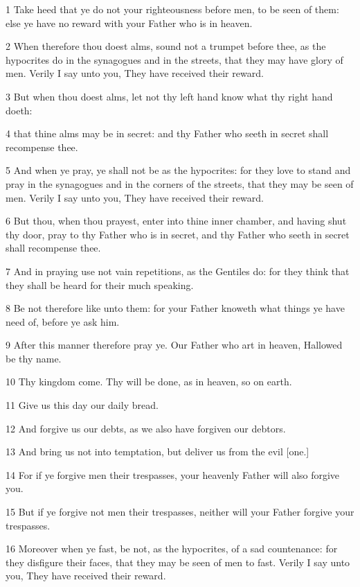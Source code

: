 \par 1 Take heed that ye do not your righteousness before men, to be seen of them: else ye have no reward with your Father who is in heaven.
\par 2 When therefore thou doest alms, sound not a trumpet before thee, as the hypocrites do in the synagogues and in the streets, that they may have glory of men. Verily I say unto you, They have received their reward.
\par 3 But when thou doest alms, let not thy left hand know what thy right hand doeth:
\par 4 that thine alms may be in secret: and thy Father who seeth in secret shall recompense thee.
\par 5 And when ye pray, ye shall not be as the hypocrites: for they love to stand and pray in the synagogues and in the corners of the streets, that they may be seen of men. Verily I say unto you, They have received their reward.
\par 6 But thou, when thou prayest, enter into thine inner chamber, and having shut thy door, pray to thy Father who is in secret, and thy Father who seeth in secret shall recompense thee.
\par 7 And in praying use not vain repetitions, as the Gentiles do: for they think that they shall be heard for their much speaking.
\par 8 Be not therefore like unto them: for your Father knoweth what things ye have need of, before ye ask him.
\par 9 After this manner therefore pray ye. Our Father who art in heaven, Hallowed be thy name.
\par 10 Thy kingdom come. Thy will be done, as in heaven, so on earth.
\par 11 Give us this day our daily bread.
\par 12 And forgive us our debts, as we also have forgiven our debtors.
\par 13 And bring us not into temptation, but deliver us from the evil [one.]
\par 14 For if ye forgive men their trespasses, your heavenly Father will also forgive you.
\par 15 But if ye forgive not men their trespasses, neither will your Father forgive your trespasses.
\par 16 Moreover when ye fast, be not, as the hypocrites, of a sad countenance: for they disfigure their faces, that they may be seen of men to fast. Verily I say unto you, They have received their reward.
